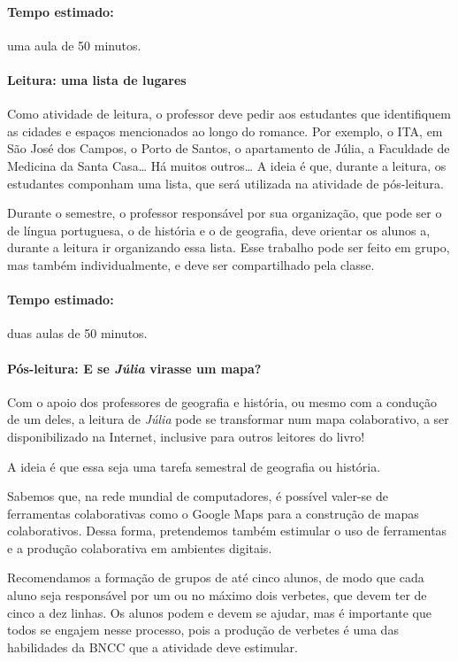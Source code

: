 \documentclass[12pt]{extarticle}
\begin{document}
\paragraph{Tempo estimado:} uma aula de 50 minutos.

\paragraph{Leitura: uma lista de lugares}

Como atividade de leitura, o professor deve pedir aos estudantes que
identifiquem as cidades e espaços mencionados ao longo do romance. Por
exemplo, o ITA, em São José dos Campos, o Porto de Santos, o apartamento
de Júlia, a Faculdade de Medicina da Santa Casa\ldots{} Há muitos
outros\ldots{} A ideia é que, durante a leitura, os estudantes componham
uma lista, que será utilizada na atividade de pós-leitura.

Durante o semestre,
o professor responsável por sua organização, que pode ser o de língua
portuguesa, o de história e o de geografia, deve orientar os alunos a,
durante a leitura ir organizando essa lista. Esse trabalho pode ser
feito em grupo, mas também individualmente, e deve ser compartilhado
pela classe.

\paragraph{Tempo estimado:} duas aulas de 50 minutos.

\paragraph{Pós-leitura: E se \emph{Júlia} virasse um mapa?}

Com o apoio dos professores de geografia e história, ou mesmo com a
condução de um deles, a leitura de \emph{Júlia} pode se transformar num
mapa colaborativo, a ser disponibilizado na Internet, inclusive para
outros leitores do livro!

A ideia é que essa seja uma tarefa semestral de geografia ou história.

Sabemos que, na rede mundial de computadores, é possível valer-se de
ferramentas colaborativas como o Google Maps para a construção de mapas
colaborativos. Dessa forma, pretendemos também estimular o uso de ferramentas e a produção colaborativa em ambientes digitais.

Recomendamos a formação de grupos de até cinco alunos, de modo que cada
aluno seja responsável por um ou no máximo dois verbetes, que devem ter
de cinco a dez linhas. Os alunos podem e devem se ajudar, mas é
importante que todos se engajem nesse processo, pois a produção de verbetes é uma das habilidades da BNCC que a atividade deve estimular.
\end{document}
